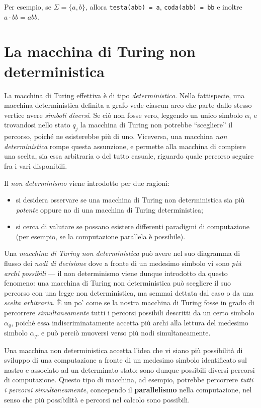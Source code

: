 \documentclass[10pt]{\classname}
\theoremstyle{newlinethm}
\theoremstyle{theorem}
\theoremstyle{definition}
\theoremstyle{definition}
\theoremstyle{definition}
\theoremstyle{definition}
\begin{document}
Per esempio, se $\Sigma = \{a, b\}$, allora \texttt{testa(abb) = a}, \texttt{coda(abb) = bb} e inoltre $a \cdot bb = abb$.


\section{La macchina di Turing non deterministica}

La macchina di Turing effettiva è di tipo \emph{deterministico}. Nella
fattispecie, una macchina deterministica definita a grafo vede ciascun arco che
parte dallo stesso vertice avere \emph{simboli diversi}. Se ciò non fosse vero,
leggendo un unico simbolo $\alpha_i$ e trovandosi nello stato $q_j$ la macchina
di Turing non potrebbe ``scegliere'' il percorso, poiché ne esisterebbe più di
uno. Viceversa, una macchina \emph{non deterministica} rompe questa assunzione,
e permette alla macchina di compiere una scelta, sia essa arbitraria o del
tutto casuale, riguardo quale percorso seguire fra i vari disponibili. 

Il \emph{non determinismo} viene introdotto per due ragioni:
\begin{itemize}
    \item si desidera osservare se una macchina di Turing non deterministica
        sia più \emph{potente} oppure no di una macchina di Turing deterministica;
    \item si cerca di valutare se possano esistere differenti paradigmi di
        computazione (per esempio, se la computazione parallela è possibile).
\end{itemize}

Una \emph{macchina di Turing non deterministica} può avere nel suo diagramma di
flusso dei \emph{nodi di decisione} dove a fronte di un medesimo simbolo vi
sono \emph{più archi possibili} --- il non determinismo viene dunque introdotto
da questo fenomeno: una macchina di Turing non deterministica può scegliere il
suo percorso con una legge non deterministica, ma semmai dettata dal caso o da
una \emph{scelta arbitraria}. È un po' come se la nostra macchina di Turing
fosse in grado di percorrere \emph{simultaneamente} tutti i percorsi possibili
descritti da un certo simbolo $\alpha_q$, poiché essa indiscriminatamente
accetta più archi alla lettura del medesimo simbolo $\alpha_q$, e può perciò
muoversi verso più nodi simultaneamente.

Una macchina non deterministica accetta l'idea che vi siano più possibilità di
sviluppo di una computazione a fronte di un medesimo simbolo identificato sul
nastro e associato ad un determinato stato; sono dunque possibili diversi
percorsi di computazione. Questo tipo di macchina, ad esempio, potrebbe
percorrere \emph{tutti i percorsi simultaneamente}, concependo il
\textbf{parallelismo} nella computazione, nel senso che più possibilità e
percorsi nel calcolo sono possibili. 
\end{document}
